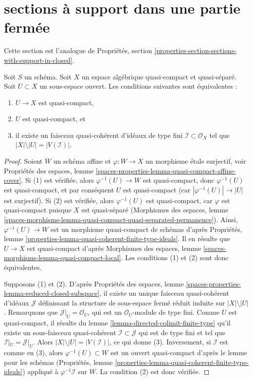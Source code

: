 \section{sections à support dans une partie fermée}
\label{section-sections-with-support-in-closed}

\noindent
Cette section est l'analogue de
Propriétés, section \ref{properties-section-sections-with-support-in-closed}.

\begin{lemma}
\label{lemma-quasi-coherent-finite-type-ideals}
Soit $S$ un schéma.
Soit $X$ un espace algébrique quasi-compact et quasi-séparé.
Soit $U \subset X$ un sous-espace ouvert. Les conditions suivantes sont équivalentes :
\begin{enumerate}
\item $U \to X$ est quasi-compact,
\item $U$ est quasi-compact, et
\item il existe un faisceau quasi-cohérent d'idéaux de type fini
$\mathcal{I} \subset \mathcal{O}_X$ tel que
$|X| \setminus |U| = |V(\mathcal{I})|$.
\end{enumerate}
\end{lemma}

\begin{proof}
Soient $W$ un schéma affine et $\varphi : W \to X$ un morphisme étale
surjectif, voir Propriétés des espaces, lemme
\ref{spaces-properties-lemma-quasi-compact-affine-cover}.
Si (1) est vérifiée, alors $\varphi^{-1}(U) \to W$ est quasi-compact, donc
$\varphi^{-1}(U)$ est quasi-compact, et par conséquent $U$ est quasi-compact
(car $|\varphi^{-1}(U)| \to |U|$ est surjectif). Si (2) est vérifiée, alors
$\varphi^{-1}(U)$ est quasi-compact, car $\varphi$ est quasi-compact
puisque $X$ est quasi-séparé (Morphismes des espaces,
lemme \ref{spaces-morphisms-lemma-quasi-compact-quasi-separated-permanence}).
Ainsi, $\varphi^{-1}(U) \to W$ est un morphisme quasi-compact de schémas d'après
Propriétés, lemme \ref{properties-lemma-quasi-coherent-finite-type-ideals}.
Il en résulte que $U \to X$ est quasi-compact d'après
Morphismes des espaces, lemme \ref{spaces-morphisms-lemma-quasi-compact-local}.
Les conditions (1) et (2) sont donc équivalentes.

\medskip\noindent
Supposons (1) et (2). D'après
Propriétés des espaces, lemme
\ref{spaces-properties-lemma-reduced-closed-subspace},
il existe un unique faisceau quasi-cohérent d'idéaux $\mathcal{J}$ définissant
la structure de sous-espace fermé réduit induite sur $|X| \setminus |U|$.
Remarquons que $\mathcal{J}|_U = \mathcal{O}_U$, qui est un
$\mathcal{O}_U$-module de type fini.
Comme $U$ est quasi-compact, il résulte du
lemme \ref{lemma-directed-colimit-finite-type}
qu'il existe un sous-faisceau quasi-cohérent
$\mathcal{I} \subset \mathcal{J}$ qui est de type fini
et tel que $\mathcal{I}|_U = \mathcal{J}|_U$.
Alors $|X| \setminus |U| = |V(\mathcal{I})|$, ce qui donne (3). Inversement,
si $\mathcal{I}$ est comme en (3), alors $\varphi^{-1}(U) \subset W$
est un ouvert quasi-compact d'après le lemme pour les schémas
(Propriétés, lemme \ref{properties-lemma-quasi-coherent-finite-type-ideals})
appliqué à $\varphi^{-1}\mathcal{I}$ sur $W$.
La condition (2) est donc vérifiée.
\end{proof}

